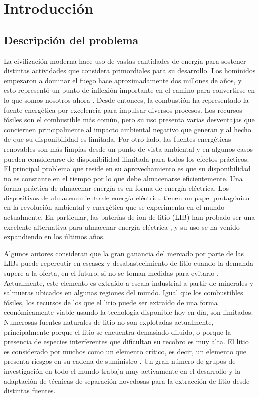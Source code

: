 \chapter{Introducción}

\section{Descripción del problema}\label{sec:descrip} %
La civilización moderna hace uso de vastas cantidades de energía para sostener distintas actividades que considera primordiales para su desarrollo. Los homínidos empezaron a dominar el fuego hace aproximadamente dos millones de años, y esto representó un punto de inflexión importante en el camino para convertirse en lo que somos nosotros ahora \citep{Gowlett2016}. Desde entonces, la combustión ha representado la fuente energética por excelencia para impulsar diversos procesos. Los recursos fósiles son el combustible más común, pero su uso presenta varias desventajas que conciernen principalmente al impacto ambiental negativo que generan y al hecho de que su disponibilidad es limitada. Por otro lado, las fuentes energéticas renovables son más limpias desde un punto de vista ambiental y en algunos casos pueden considerarse de disponibilidad ilimitada para todos los efectos prácticos. El principal problema que reside en su aprovechamiento es que su disponibilidad no es constante en el tiempo por lo que debe almacenarse eficientemente. Una forma práctica de almacenar energía es en forma de energía eléctrica. Los dispositivos de almacenamiento de energía eléctrica tienen un papel protagónico en la revolución ambiental y energética que se experimenta en el mundo actualmente. En particular, las baterías de ion de litio (LIB) han probado ser una excelente alternativa para almacenar energía eléctrica \citep{Chen2020}, y su uso se ha venido expandiendo en los últimos años.

Algunos autores consideran que la gran ganancia del mercado por parte de las LIBs puede repercutir en escasez y desabastecimiento de litio cuando la demanda supere a la oferta, en el futuro, si no se toman medidas para evitarlo \citep{SVERDRUP2016, VIKSTROM2013, Benson2017, Chagnes2015}. Actualmente, este elemento es extraído a escala industrial a partir de minerales y salmueras ubicados en algunas regiones del mundo. Igual que los combustibles fósiles, los recursos de los que el litio puede ser extraído de una forma económicamente viable usando la tecnología disponible hoy en día, son limitados. Numerosas fuentes naturales de litio no son explotadas actualmente, principalmente porque el litio se encuentra demasiado diluido, o porque la presencia de especies interferentes que dificultan su recobro es muy alta. El litio es considerado por muchos como un elemento crítico, es decir, un elemento que presenta riesgos en su cadena de suministro \citep{Zubi2018}. Un gran número de grupos de investigación en todo el mundo trabaja muy activamente en el desarrollo y la adaptación de técnicas de separación novedosas para la extracción de litio desde distintas fuentes. 


